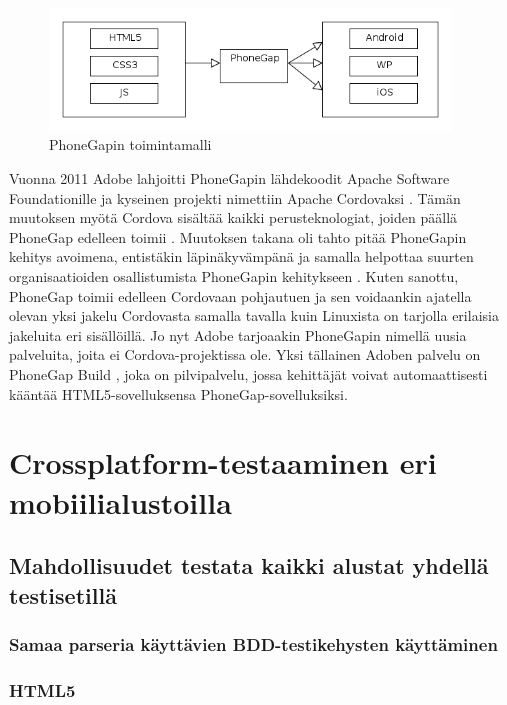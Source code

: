 \documentclass[finnish,nonumbib,nocopyright]{gradu2}
\begin{document}
\begin{figure}
\centering
\includegraphics[width=0.95\textwidth]{phonegap}
\caption{PhoneGapin toimintamalli \cite{phonegap}}
\end{figure}

Vuonna 2011 Adobe lahjoitti PhoneGapin lähdekoodit Apache Software Foundationille ja kyseinen projekti nimettiin Apache Cordovaksi \cite{cordova}. Tämän muutoksen myötä Cordova sisältää kaikki perusteknologiat, joiden päällä PhoneGap edelleen toimii \cite{cordovablog}. Muutoksen takana oli tahto pitää PhoneGapin kehitys avoimena, entistäkin läpinäkyvämpänä ja samalla helpottaa suurten organisaatioiden osallistumista PhoneGapin kehitykseen \cite{cordovablog}. Kuten sanottu, PhoneGap toimii edelleen Cordovaan pohjautuen ja sen voidaankin ajatella olevan yksi jakelu Cordovasta samalla tavalla kuin Linuxista on tarjolla erilaisia jakeluita eri sisällöillä. Jo nyt Adobe tarjoaakin PhoneGapin nimellä uusia palveluita, joita ei Cordova-projektissa ole. Yksi tällainen Adoben palvelu on PhoneGap Build \cite{phonegapbuild}, joka on pilvipalvelu, jossa kehittäjät voivat automaattisesti kääntää HTML5-sovelluksensa PhoneGap-sovelluksiksi.

\chapter{Crossplatform-testaaminen eri mobiilialustoilla}
\label{chap:platforms}

\section{Mahdollisuudet testata kaikki alustat yhdellä testisetillä}

\subsection{Samaa parseria käyttävien BDD-testikehysten käyttäminen}

\subsection{HTML5}
\end{document}

